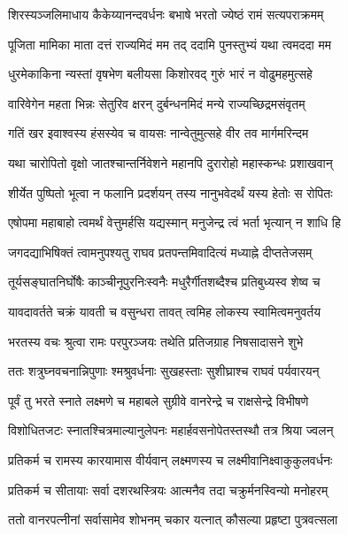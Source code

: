 
\twolineshloka
{शिरस्यञ्जलिमाधाय कैकेय्यानन्दवर्धनः}
{बभाषे भरतो ज्येष्ठं रामं सत्यपराक्रमम्} %

\twolineshloka
{पूजिता मामिका माता दत्तं राज्यमिदं मम}
{तद् ददामि पुनस्तुभ्यं यथा त्वमददा मम} %

\twolineshloka
{धुरमेकाकिना न्यस्तां वृषभेण बलीयसा}
{किशोरवद् गुरुं भारं न वोढुमहमुत्सहे} %

\twolineshloka
{वारिवेगेन महता भिन्नः सेतुरिव क्षरन्}
{दुर्बन्धनमिदं मन्ये राज्यच्छिद्रमसंवृतम्} %

\twolineshloka
{गतिं खर इवाश्वस्य हंसस्येव च वायसः}
{नान्वेतुमुत्सहे वीर तव मार्गमरिन्दम} %

\twolineshloka
{यथा चारोपितो वृक्षो जातश्चान्तर्निवेशने}
{महानपि दुरारोहो महास्कन्धः प्रशाखवान्} %

\twolineshloka
{शीर्येत पुष्पितो भूत्वा न फलानि प्रदर्शयन्}
{तस्य नानुभवेदर्थं यस्य हेतोः स रोपितः} %

\twolineshloka
{एषोपमा महाबाहो त्वमर्थं वेत्तुमर्हसि}
{यद्यस्मान् मनुजेन्द्र त्वं भर्ता भृत्यान् न शाधि हि} %

\twolineshloka
{जगदद्याभिषिक्तं त्वामनुपश्यतु राघव}
{प्रतपन्तमिवादित्यं मध्याह्ने दीप्ततेजसम्} %

\twolineshloka
{तूर्यसङ्घातनिर्घोषैः काञ्चीनूपुरनिःस्वनैः}
{मधुरैर्गीतशब्दैश्च प्रतिबुध्यस्व शेष्व च} %

\twolineshloka
{यावदावर्तते चक्रं यावती च वसुन्धरा}
{तावत् त्वमिह लोकस्य स्वामित्वमनुवर्तय} %

\twolineshloka
{भरतस्य वचः श्रुत्वा रामः परपुरञ्जयः}
{तथेति प्रतिजग्राह निषसादासने शुभे} %

\twolineshloka
{ततः शत्रुघ्नवचनान्निपुणाः श्मश्रुवर्धनाः}
{सुखहस्ताः सुशीघ्राश्च राघवं पर्यवारयन्} %

\twolineshloka
{पूर्वं तु भरते स्नाते लक्ष्मणे च महाबले}
{सुग्रीवे वानरेन्द्रे च राक्षसेन्द्रे विभीषणे} %

\twolineshloka
{विशोधितजटः स्नातश्चित्रमाल्यानुलेपनः}
{महार्हवसनोपेतस्तस्थौ तत्र श्रिया ज्वलन्} %

\twolineshloka
{प्रतिकर्म च रामस्य कारयामास वीर्यवान्}
{लक्ष्मणस्य च लक्ष्मीवानिक्ष्वाकुकुलवर्धनः} %

\twolineshloka
{प्रतिकर्म च सीतायाः सर्वा दशरथस्त्रियः}
{आत्मनैव तदा चक्रुर्मनस्विन्यो मनोहरम्} %

\twolineshloka
{ततो वानरपत्नीनां सर्वासामेव शोभनम्}
{चकार यत्नात् कौसल्या प्रहृष्टा पुत्रवत्सला} %


